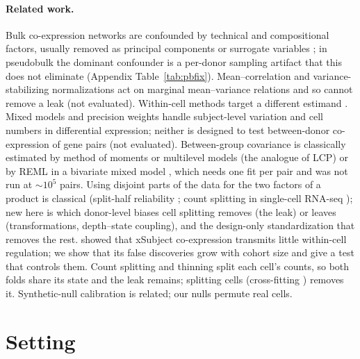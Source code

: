 \documentclass[10pt,letterpaper]{article}
\theoremstyle{definition}
\theoremstyle{remark}
\begin{document}
\paragraph{Related work.} Bulk co-expression networks are confounded by technical and compositional factors, usually removed as principal components or surrogate variables \citep{Freytag2015,Parsana2019,LeekStorey2007}; in pseudobulk the dominant confounder is a per-donor sampling artifact that this does not eliminate (Appendix Table~\ref{tab:pbfix}). Mean--correlation and variance-stabilizing normalizations \citep{Wang2022Hicks,Hafemeister2019sctransform} act on marginal mean--variance relations and so cannot remove a leak (not evaluated). Within-cell methods target a different estimand \citep{Su2023CSCORE,Lu2023Dozer,CrowGillis2018}. Mixed models \citep{He2021NEBULA} and precision weights \citep{Hoffman2023dreamlet} handle subject-level variation and cell numbers in differential expression; neither is designed to test between-donor co-expression of gene pairs (not evaluated). Between-group covariance is classically estimated by method of moments or multilevel models \citep{Amemiya1985,Muthen1994,Ludtke2008} (the analogue of LCP) or by REML in a bivariate mixed model \citep{Lee2012bivariateREML}, which needs one fit per pair and was not run at $\sim\!10^5$ pairs. Using disjoint parts of the data for the two factors of a product is classical (split-half reliability \citep{Spearman1910,Brown1910}; count splitting in single-cell RNA-seq \citep{Neufeld2024countsplit}); new here is which donor-level biases cell splitting removes (the leak) or leaves (transformations, depth--state coupling), and the design-only standardization that removes the rest. \citet{Chu2024xSubject,Chu2026modes} showed that xSubject co-expression transmits little within-cell regulation; we show that its false discoveries grow with cohort size and give a test that controls them. Count splitting and thinning \citep{Neufeld2024countsplit,Neufeld2024thinning,Dharamshi2025gdt,Leiner2025fission} split each cell's counts, so both folds share its state and the leak remains; splitting cells (cross-fitting \citep{Chernozhukov2018DML}) removes it. Synthetic-null calibration \citep{Song2025ClusterDE,Jiang2025Nullstrap} is related; our nulls permute real cells.

\section{Setting}\label{sec:setting}
\end{document}
